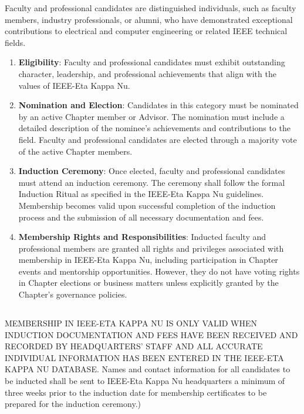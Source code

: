 \documentclass[10pt, oneside]{article}
\begin{document}
Faculty and professional candidates are distinguished individuals, such as faculty members, industry professionals, or alumni, who have demonstrated exceptional contributions to electrical and computer engineering or related IEEE technical fields.

\begin{enumerate}
    \item \textbf{Eligibility}: Faculty and professional candidates must exhibit outstanding character, leadership, and professional achievements that align with the values of IEEE-Eta Kappa Nu.

    \item \textbf{Nomination and Election}: Candidates in this category must be nominated by an active Chapter member or Advisor. The nomination must include a detailed description of the nominee’s achievements and contributions to the field. Faculty and professional candidates are elected through a majority vote of the active Chapter members.

    \item \textbf{Induction Ceremony}: Once elected, faculty and professional candidates must attend an induction ceremony. The ceremony shall follow the formal Induction Ritual as specified in the IEEE-Eta Kappa Nu guidelines. Membership becomes valid upon successful completion of the induction process and the submission of all necessary documentation and fees.

    \item \textbf{Membership Rights and Responsibilities}: Inducted faculty and professional members are granted all rights and privileges associated with membership in IEEE-Eta Kappa Nu, including participation in Chapter events and mentorship opportunities. However, they do not have voting rights in Chapter elections or business matters unless explicitly granted by the Chapter's governance policies.
\end{enumerate}

\subsection{}
MEMBERSHIP IN IEEE-ETA KAPPA NU IS ONLY VALID WHEN INDUCTION DOCUMENTATION AND FEES HAVE BEEN RECEIVED AND RECORDED BY
HEADQUARTERS’ STAFF AND ALL ACCURATE INDIVIDUAL INFORMATION HAS BEEN
ENTERED IN THE IEEE-ETA KAPPA NU DATABASE. Names and contact information for all candidates to be inducted shall be sent to IEEE-Eta Kappa Nu headquarters a minimum of three weeks prior to the induction date for membership certificates to be prepared for the induction ceremony.)
\end{document}
